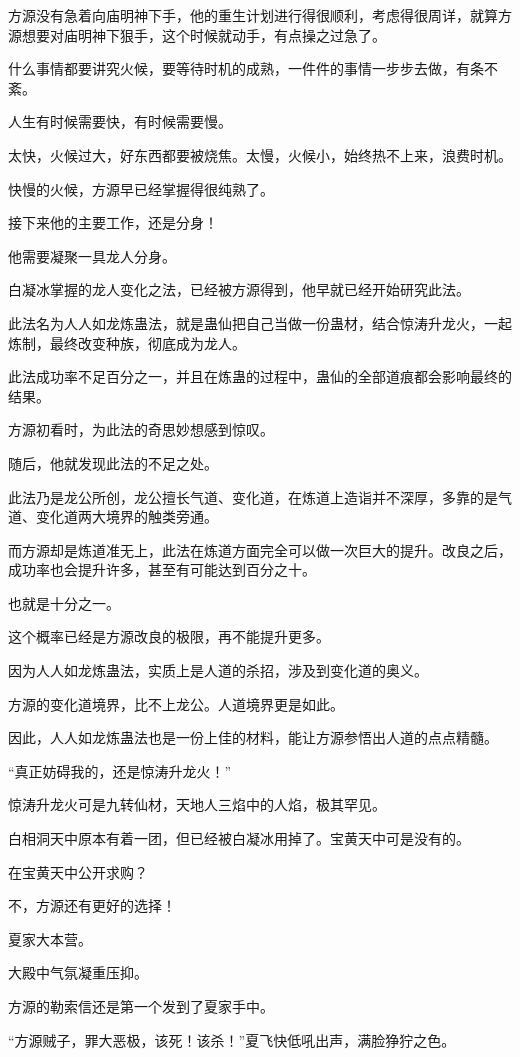\begin{this_body}
方源没有急着向庙明神下手，他的重生计划进行得很顺利，考虑得很周详，就算方源想要对庙明神下狠手，这个时候就动手，有点操之过急了。

什么事情都要讲究火候，要等待时机的成熟，一件件的事情一步步去做，有条不紊。

人生有时候需要快，有时候需要慢。

太快，火候过大，好东西都要被烧焦。太慢，火候小，始终热不上来，浪费时机。

快慢的火候，方源早已经掌握得很纯熟了。

接下来他的主要工作，还是分身！

他需要凝聚一具龙人分身。

白凝冰掌握的龙人变化之法，已经被方源得到，他早就已经开始研究此法。

此法名为人人如龙炼蛊法，就是蛊仙把自己当做一份蛊材，结合惊涛升龙火，一起炼制，最终改变种族，彻底成为龙人。

此法成功率不足百分之一，并且在炼蛊的过程中，蛊仙的全部道痕都会影响最终的结果。

方源初看时，为此法的奇思妙想感到惊叹。

随后，他就发现此法的不足之处。

此法乃是龙公所创，龙公擅长气道、变化道，在炼道上造诣并不深厚，多靠的是气道、变化道两大境界的触类旁通。

而方源却是炼道准无上，此法在炼道方面完全可以做一次巨大的提升。改良之后，成功率也会提升许多，甚至有可能达到百分之十。

也就是十分之一。

这个概率已经是方源改良的极限，再不能提升更多。

因为人人如龙炼蛊法，实质上是人道的杀招，涉及到变化道的奥义。

方源的变化道境界，比不上龙公。人道境界更是如此。

因此，人人如龙炼蛊法也是一份上佳的材料，能让方源参悟出人道的点点精髓。

“真正妨碍我的，还是惊涛升龙火！”

惊涛升龙火可是九转仙材，天地人三焰中的人焰，极其罕见。

白相洞天中原本有着一团，但已经被白凝冰用掉了。宝黄天中可是没有的。

在宝黄天中公开求购？

不，方源还有更好的选择！

夏家大本营。

大殿中气氛凝重压抑。

方源的勒索信还是第一个发到了夏家手中。

“方源贼子，罪大恶极，该死！该杀！”夏飞快低吼出声，满脸狰狞之色。


\end{this_body}
